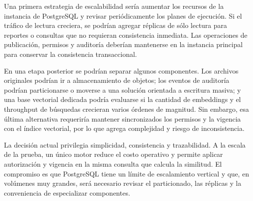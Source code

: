 Una primera estrategia de escalabilidad sería aumentar los recursos de la instancia de PostgreSQL y revisar periódicamente los planes de ejecución. Si el tráfico de lectura creciera, se podrían agregar réplicas de sólo lectura para reportes o consultas que no requieran consistencia inmediata. Las operaciones de publicación, permisos y auditoría deberían mantenerse en la instancia principal para conservar la consistencia transaccional.

En una etapa posterior se podrían separar algunos componentes. Los archivos originales podrían ir a almacenamiento de objetos; los eventos de auditoría podrían particionarse o moverse a una solución orientada a escritura masiva; y una base vectorial dedicada podría evaluarse si la cantidad de embeddings y el throughput de búsquedas crecieran varios órdenes de magnitud. Sin embargo, esa última alternativa requeriría mantener sincronizados los permisos y la vigencia con el índice vectorial, por lo que agrega complejidad y riesgo de inconsistencia.

La decisión actual privilegia simplicidad, consistencia y trazabilidad. A la escala de la prueba, un único motor reduce el costo operativo y permite aplicar autorización y vigencia en la misma consulta que calcula la similitud. El compromiso es que PostgreSQL tiene un límite de escalamiento vertical y que, en volúmenes muy grandes, será necesario revisar el particionado, las réplicas y la conveniencia de especializar componentes.
